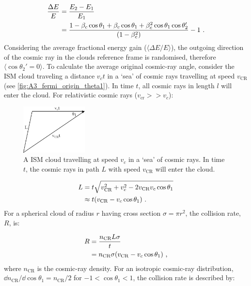\begin{equation}
    \begin{aligned}
        \frac{\Delta E}{E}&=\frac{E_2-E_1}{E_1} \\
        &=\frac{1-\beta_c\cos\theta_1+\beta_c\cos\theta_1+\beta_c^2\cos\theta_1\cos\theta_2'}{\qty(1-\beta_c^2)}-1\text{ .}
    \end{aligned} \label{eq:A3_DSA_fermi_orig_frac_energy}
\end{equation}
\noindent Considering the average fractional energy gain ($\langle \Delta E/E \rangle$), the outgoing direction of the cosmic ray in the clouds reference frame is randomised, therefore $\langle \cos\theta_2'=0 \rangle$. To calculate the average original cosmic-ray angle, consider the ISM cloud traveling a distance $v_ct$ in a `sea' of cosmic rays travelling at speed $v_\text{CR}$ (see \autoref{fig:A3_fermi_origin_theta1}). In time $t$, all cosmic rays in length $l$ will enter the cloud. For relativistic cosmic rays ($v_\text{cr}>>v_c$):
\begin{figure}
    \centering
    \includegraphics[width=0.3\textwidth]{A3_Diffusive_Shock_Acceleration/Images/fermi_original_theta1.png}
    \caption{A ISM cloud travelling at speed $v_c$ in a `sea' of cosmic rays. In time $t$, the cosmic rays in path $L$ with speed $v_\text{CR}$ will enter the cloud.}
    \label{fig:A3_fermi_origin_theta1}
\end{figure}
\begin{equation}
    \begin{aligned}
        L&=t\sqrt{v_\text{CR}^2+v_c^2-2v_\text{CR}v_c\cos\theta_1} \\
        &\approx t\qty(v_\text{CR}-v_c\cos\theta_1) \text{ .}
    \end{aligned}
\end{equation}
\noindent For a spherical cloud of radius $r$ having cross section $\sigma=\pi r^2$, the collision rate, $R$, is:

\begin{equation}
    \begin{aligned}
        R&=\frac{n_\text{CR}L\sigma}{t} \\
        &=n_\text{CR}\sigma\qty(v_\text{CR}-v_c\cos\theta_1) \text { ,}
    \end{aligned}
\end{equation}
\noindent where $n_\text{CR}$ is the cosmic-ray density. For an isotropic cosmic-ray distribution, $\dd{n_\text{CR}}/\dd{\cos\theta_1}=n_\text{CR}/2$ for $-1<\cos\theta_1<1$, the collision rate is described by:


